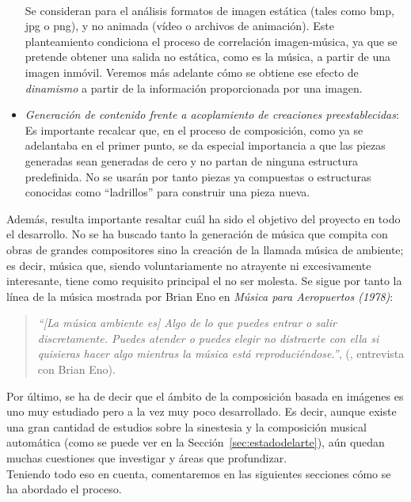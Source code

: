 \begin{itemize}
			\\Se consideran para el análisis formatos de imagen estática (tales como bmp, jpg o png), y no animada (vídeo o archivos de animación). Este planteamiento condiciona el proceso de correlación imagen-música, ya que se pretende obtener una salida no estática, como es la música, a partir de una imagen inmóvil. Veremos más adelante cómo se obtiene ese efecto de \emph{dinamismo} a partir de la información proporcionada por una imagen.
		\item \emph{Generación de contenido frente a acoplamiento de creaciones preestablecidas}:
			\vspace{0.1in}
			\\Es importante recalcar que, en el proceso de composición, como ya se adelantaba en el primer punto, se da especial importancia a que las piezas generadas sean generadas de cero y no partan de ninguna estructura predefinida. No se usarán por tanto piezas ya compuestas o estructuras conocidas como ``ladrillos'' para construir una pieza nueva.
		\end{itemize}
		
		Además, resulta importante resaltar cuál ha sido el objetivo del proyecto en todo el desarrollo. No se ha buscado tanto la generación de música que compita con obras de grandes compositores sino la creación de la llamada música de ambiente; es decir, música que, siendo voluntariamente no atrayente ni excesivamente interesante, tiene como requisito principal el no ser molesta. Se sigue por tanto la línea de la música mostrada por Brian Eno en \emph{Música para Aeropuertos (1978)}:
		
		\begin{quote}
		\emph{``[La música ambiente es] Algo de lo que puedes entrar o salir discretamente. Puedes atender o puedes elegir no distraerte con ella si quisieras hacer algo mientras la música está reproduciéndose.''}, (\cite{BrianEnoInterview}, entrevista con Brian Eno).
		\end{quote}		
		
		Por último, se ha de decir que el ámbito de la composición basada en imágenes es uno muy estudiado pero a la vez muy poco desarrollado. Es decir, aunque existe una gran cantidad de estudios sobre la sinestesia y la composición musical automática (como se puede ver en la Sección~\ref{sec:estadodelarte}), aún quedan muchas cuestiones que investigar y áreas que profundizar.\\
		
		Teniendo todo eso en cuenta, comentaremos en las siguientes secciones cómo se ha abordado el proceso.
		



